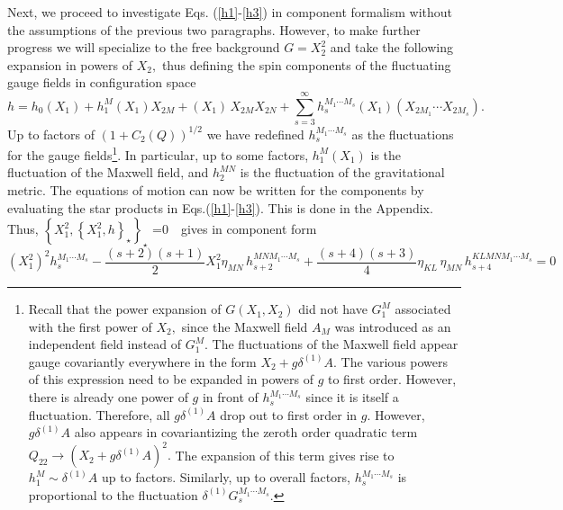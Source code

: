 \documentclass[a4paper,12pt]{article}
\begin{document}
Next, we proceed to investigate Eqs. (\ref{h1}-\ref{h3}) in component
formalism without the assumptions of the previous two paragraphs. However,
to make further progress we will specialize to the free background $%
G=X_{2}^{2}$ and take the following expansion in powers of $X_{2},$ thus
defining the spin components of the fluctuating gauge fields in
configuration space 
\begin{equation}
h=h_{0}\left( X_{1}\right) +h_{1}^{M}\left( X_{1}\right) X_{2M}+\left(
X_{1}\right) \,X_{2M}X_{2N}+\sum_{s=3}^{\infty }h_{s}^{M_{1}\cdots
M_{s}}\left( X_{1}\right) \left( X_{2M_{1}}\cdots X_{2M_{s}}\right) .
\label{h}
\end{equation}
Up to factors of $\left( 1+C_{2}\left( Q\right) \right) ^{1/2}$ we have
redefined $h_{s}^{M_{1}\cdots M_{s}}$ as the fluctuations for the gauge
fields\footnote{%
Recall that the power expansion of $G\left( X_{1},X_{2}\right) $ did not
have $G_{1}^{M}$ associated with the first power of $X_{2},$ since the
Maxwell field $A_{M}$ was introduced as an independent field instead of $%
G_{1}^{M}$. The fluctuations of the Maxwell field appear gauge covariantly
everywhere in the form $X_{2}+g\delta ^{\left( 1\right) }A.$ The various
powers of this expression need to be expanded in powers of $g$ to first
order. However, there is already one power of $g$ in front of $%
h_{s}^{M_{1}\cdots M_{s}}$ since it is itself a fluctuation. Therefore, all $%
g\delta ^{\left( 1\right) }A$ drop out to first order in $g$. However, $%
g\delta ^{\left( 1\right) }A$ also appears in covariantizing the zeroth
order quadratic term $Q_{22}\rightarrow \left( X_{2}+g\delta ^{\left(
1\right) }A\right) ^{2}.$ The expansion of this term gives rise to $%
h_{1}^{M}\sim \delta ^{\left( 1\right) }A$ up to factors. Similarly, up to
overall factors, $h_{s}^{M_{1}\cdots M_{s}}$ is proportional to the
fluctuation $\delta ^{\left( 1\right) }G_{s}^{M_{1}\cdots M_{s}}$.}. In
particular, up to some factors, $h_{1}^{M}\left( X_{1}\right) $ is the
fluctuation of the Maxwell field, and $h_{2}^{MN}$ is the fluctuation of the
gravitational metric. The equations of motion can now be written for the
components by evaluating the star products in Eqs.(\ref{h1}-\ref{h3}). This
is done in the Appendix. Thus, $\left\{ X_{1}^{2},\left\{
X_{1}^{2},h\right\} _{\star }\right\} _{\star }$ =0\ \ gives in component
form 
\begin{equation}
\left( X_{1}^{2}\right) ^{2}h_{s}^{M_{1}\cdots M_{s}}-\frac{\left(
s+2\right) \left( s+1\right) }{2}X_{1}^{2}\eta _{MN}\,h_{s+2}^{MNM_{1}\cdots
M_{s}}+\frac{\left( s+4\right) \left( s+3\right) }{4}\eta _{KL}\,\eta
_{MN}\,h_{s+4}^{KLMNM_{1}\cdots M_{s}}=0  \label{fluc1}
\end{equation}
\end{document}
